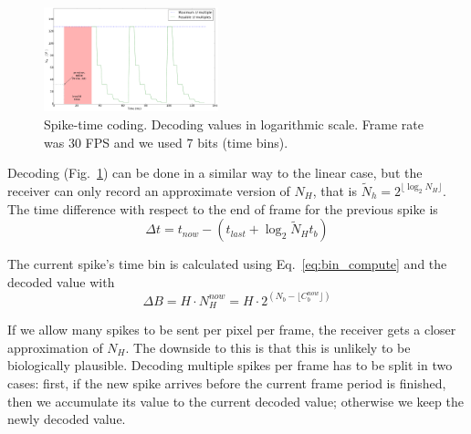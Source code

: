 \documentclass[conference]{IEEEtran}
\begin{document}
\begin{figure}[htb]
  \centering
  \includegraphics[width=0.45\textwidth]{spike_values_exp}
  
  \caption{Spike-time coding. Decoding values in logarithmic scale. Frame rate was 30 FPS and we used 7 bits (time bins). }
  \label{fig:exponential_time}
\end{figure} 

Decoding (Fig.~\ref{fig:exponential_time}) can be done in a similar way to the linear case, but the receiver can only record an approximate version of $N_{H}$, that is $\tilde{N}_{h} = 2^{\lfloor\log_2 N_{H}\rfloor}$. The time difference with respect to the end of frame for the previous spike is
\begin{equation}
\Delta t = t_{now} - \left( t_{last} + \log_{2}\tilde{N}_{H}t_{b} \right)
\label{eq:time_diff_exp}
\end{equation}

The current spike's time bin is calculated using Eq.~\ref{eq:bin_compute} and the decoded value with
\begin{equation}
\Delta B = H\cdot N_{H}^{now} = H\cdot 2^{ \left( N_{b} - \lfloor C^{now}_{b}\rfloor  \right)}
\label{eq:new_Nh_exp}
\end{equation}

If we allow many spikes to be sent per pixel per frame, the receiver gets a closer approximation of $N_{H}$. The downside to this is that this is unlikely to be biologically plausible. Decoding multiple spikes per frame has to be split in two cases: first, if the new spike arrives before the current frame period is finished, then we accumulate its value to the current decoded value; otherwise we keep the newly decoded value. 



\end{document}
